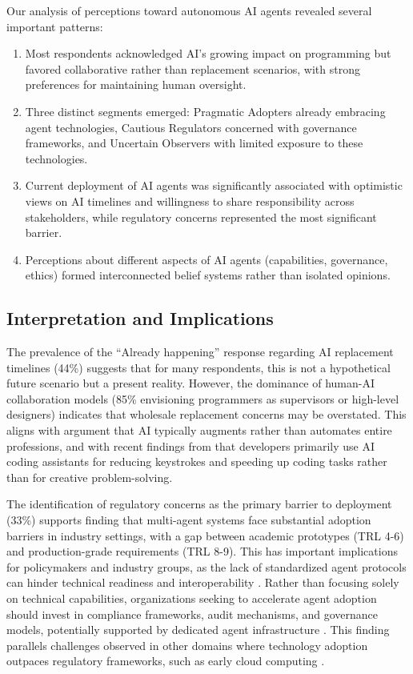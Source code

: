 \documentclass{article}
\begin{document}
Our analysis of perceptions toward autonomous AI agents revealed several
important patterns:

\begin{enumerate}
\def\labelenumi{\arabic{enumi}.}
\item
  Most respondents acknowledged AI's growing impact on programming but
  favored collaborative rather than replacement scenarios, with strong
  preferences for maintaining human oversight.
\item
  Three distinct segments emerged: Pragmatic Adopters already embracing
  agent technologies, Cautious Regulators concerned with governance
  frameworks, and Uncertain Observers with limited exposure to these
  technologies.
\item
  Current deployment of AI agents was significantly associated with
  optimistic views on AI timelines and willingness to share
  responsibility across stakeholders, while regulatory concerns
  represented the most significant barrier.
\item
  Perceptions about different aspects of AI agents (capabilities,
  governance, ethics) formed interconnected belief systems rather than
  isolated opinions.
\end{enumerate}

\subsection{Interpretation and
Implications}\label{interpretation-and-implications}

The prevalence of the ``Already happening'' response regarding AI
replacement timelines (44\%) suggests that for many respondents, this is
not a hypothetical future scenario but a present reality. However, the
dominance of human-AI collaboration models (85\% envisioning programmers
as supervisors or high-level designers) indicates that wholesale
replacement concerns may be overstated. This aligns with \cite{DavenportKirby2016} argument that AI typically augments rather than automates
entire professions, and with recent findings from \cite{ICSESurvey2024} that
developers primarily use AI coding assistants for reducing keystrokes
and speeding up coding tasks rather than for creative problem-solving.

The identification of regulatory concerns as the primary barrier to
deployment (33\%) supports \cite{Wrona2023} finding that
multi-agent systems face substantial adoption barriers in industry
settings, with a gap between academic prototypes (TRL 4-6) and
production-grade requirements (TRL 8-9). This has important implications for policymakers and industry groups, as the lack of standardized agent protocols can hinder technical readiness and interoperability \citep{Yang2025SurveyAIprotocols}. Rather than focusing solely on technical capabilities, organizations seeking to accelerate agent adoption should invest in compliance frameworks, audit mechanisms, and governance models, potentially supported by dedicated agent infrastructure \citep{Chan2025Infrastructure}. This finding parallels challenges observed in other
domains where technology adoption outpaces regulatory frameworks, such
as early cloud computing \cite{SchneiderSunyaev2016}.
\end{document}
